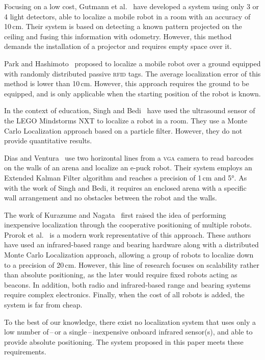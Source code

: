 \documentclass[letterpaper, 10pt, conference]{ieeeconf}
\begin{document}
Focusing on a low cost, Gutmann et al.~\cite{gutmann2013challenges} have developed a system using only 3 or 4 light detectors, able to localize a mobile robot in a room with an accuracy of 10\,cm.
Their system is based on detecting a known pattern projected on the ceiling and fusing this information with odometry.
However, this method demands the installation of a projector and requires empty space over it.

Park and Hashimoto~\cite{park2009approach} proposed to localize a mobile robot over a ground equipped with randomly distributed passive \textsc{rfid} tags.
The average localization error of this method is lower than 10\,cm.
However, this approach requires the ground to be equipped, and is only applicable when the starting position of the robot is known.

In the context of education, Singh and Bedi~\cite{singh2013map} have used the ultrasound sensor of the LEGO Mindstorms NXT to localize a robot in a room.
They use a Monte Carlo Localization approach based on a particle filter.
However, they do not provide quantitative results.

Dias and Ventura~\cite{dias2013absolute} use two horizontal lines from a \textsc{vga} camera to read barcodes on the walls of an arena and localize an e-puck robot.
Their system employs an Extended Kalman Filter algorithm and reaches a precision of 1\,cm and 5°.
As with the work of Singh and Bedi, it requires an enclosed arena with a specific wall arrangement and no obstacles between the robot and the walls.

The work of Kurazume and Nagata~\cite{kurazume1994cooperative} first raised the idea of performing inexpensive localization through the cooperative positioning of multiple robots.
Prorok et al.~\cite{prorok2012low} is a modern work representative of this approach.
These authors have used an infrared-based range and bearing hardware along with a distributed Monte Carlo Localization approach, allowing a group of robots to localize down to a precision of 20\,cm.
However, this line of research focuses on scalability rather than absolute positioning, as the later would require fixed robots acting as beacons.
In addition, both radio and infrared-based range and bearing systems require complex electronics.
Finally, when the cost of all robots is added, the system is far from cheap.

To the best of our knowledge, there exist no localization system that uses only a low number of\,--\,or a single\,--\,inexpensive onboard infrared sensor(s), and able to provide absolute positioning.
The system proposed in this paper meets these requirements.
\end{document}
